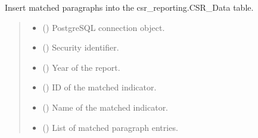 \documentclass[letterpaper,10pt,english]{sphinxmanual}
\begin{document}

\begin{fulllineitems}
\label{\detokenize{modules.data_storage:modules.data_storage.paragraph_extraction.insert_matched_data}}
\pysigstartsignatures
\pysiglinewithargsret
{}
{\sphinxparamcomma {}\sphinxparamcomma {}\sphinxparamcomma {}\sphinxparamcomma {}\sphinxparamcomma {}\sphinxparamcomma {}}
{}
\pysigstopsignatures
\sphinxAtStartPar
Insert matched paragraphs into the csr\_reporting.CSR\_Data table.
\begin{quote}\begin{description}
\begin{itemize}
\item {} 
\sphinxAtStartPar
{} () \textendash{} PostgreSQL connection object.

\item {} 
\sphinxAtStartPar
{} () \textendash{} Security identifier.

\item {} 
\sphinxAtStartPar
{} () \textendash{} Year of the report.

\item {} 
\sphinxAtStartPar
{} () \textendash{} ID of the matched indicator.

\item {} 
\sphinxAtStartPar
{} () \textendash{} Name of the matched indicator.

\item {} 
\sphinxAtStartPar
{} (\sphinxstyleliteralemphasis{\sphinxupquote{{[}}}\sphinxstyleliteralemphasis{\sphinxupquote{{]}}}) \textendash{} List of matched paragraph entries.


\end{itemize}
\end{description}
\end{quote}
\end{fulllineitems}
\end{document}
